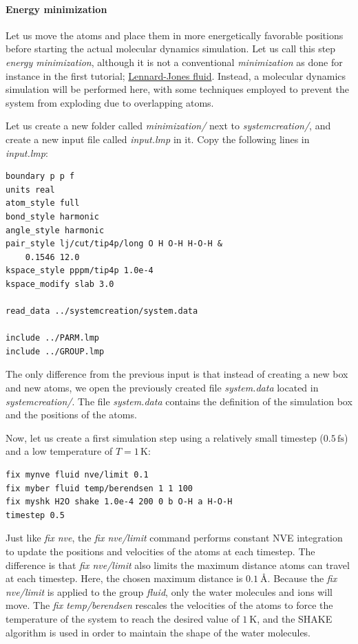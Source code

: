 \documentclass[9pt,tutorial]{livecoms}
\begin{document}
\paragraph{Energy minimization}
Let us move the atoms and place them in more energetically favorable positions
before starting the actual molecular dynamics simulation. Let us call this step
\textit{energy minimization}, although it is not a conventional \textit{minimization}
as done for instance in the first tutorial; \hyperref[lennard-jones-label]{Lennard-Jones fluid}.
Instead, a molecular dynamics simulation will be performed here, with some techniques
employed to prevent the system from exploding due to overlapping atoms.

Let us create a new folder called \textit{minimization/} next to \textit{systemcreation/},
and create a new input file called \textit{input.lmp} in it. Copy the following lines
in \textit{input.lmp}:
\begin{lstlisting}
boundary p p f
units real
atom_style full
bond_style harmonic
angle_style harmonic
pair_style lj/cut/tip4p/long O H O-H H-O-H &
    0.1546 12.0
kspace_style pppm/tip4p 1.0e-4
kspace_modify slab 3.0

read_data ../systemcreation/system.data

include ../PARM.lmp
include ../GROUP.lmp
\end{lstlisting}
The only difference from the previous input is that instead of creating a new
box and new atoms, we open the previously created file \textit{system.data}
located in \textit{systemcreation/}. The file \textit{system.data} contains the
definition of the simulation box and the positions of the atoms.

Now, let us create a first simulation step using a relatively small
timestep ($0.5\,\text{fs}$) and a low temperature of $T = 1\,\text{K}$:
\begin{lstlisting}
fix mynve fluid nve/limit 0.1
fix myber fluid temp/berendsen 1 1 100
fix myshk H2O shake 1.0e-4 200 0 b O-H a H-O-H
timestep 0.5
\end{lstlisting}
Just like \textit{fix nve}, the \textit{fix nve/limit} command performs constant
NVE integration to update the positions and velocities of the atoms at each
timestep. The difference is that \textit{fix nve/limit} also limits the maximum
distance atoms can travel at each timestep. Here, the chosen maximum distance
is $0.1~\text{\AA{}}$. Because the \textit{fix nve/limit} is applied to the
group \textit{fluid}, only the water molecules and ions will move.
The \textit{fix temp/berendsen} rescales the velocities of the atoms to
force the temperature of the system to reach the desired value of $1~\text{K}$,
and the SHAKE algorithm is used in order to maintain the shape of the water molecules.
\end{document}
